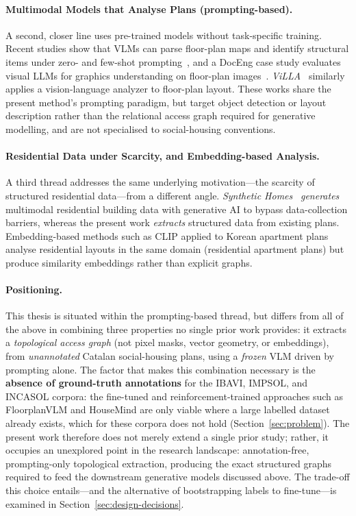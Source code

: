 \documentclass[12pt,a4paper,openright]{report}
\begin{document}
\paragraph{Multimodal Models that Analyse Plans (prompting-based).} A second, closer line uses pre-trained models without task-specific training. Recent studies show that VLMs can parse floor-plan maps and identify structural items under zero- and few-shot prompting~\cite{vlmparsefloorplan2025}, and a DocEng case study evaluates visual LLMs for graphics understanding on floor-plan images~\cite{villmsgraphics2025}. \textit{ViLLA}~\cite{villa2025} similarly applies a vision-language analyzer to floor-plan layout. These works share the present method's prompting paradigm, but target object detection or layout description rather than the relational access graph required for generative modelling, and are not specialised to social-housing conventions.

\paragraph{Residential Data under Scarcity, and Embedding-based Analysis.} A third thread addresses the same underlying motivation---the scarcity of structured residential data---from a different angle. \textit{Synthetic Homes}~\cite{eshbaugh2026synthetichomes} \emph{generates} multimodal residential building data with generative AI to bypass data-collection barriers, whereas the present work \emph{extracts} structured data from existing plans. Embedding-based methods such as CLIP applied to Korean apartment plans~\cite{clipkorean2026} analyse residential layouts in the same domain (residential apartment plans) but produce similarity embeddings rather than explicit graphs.

\paragraph{Positioning.} This thesis is situated within the prompting-based thread, but differs from all of the above in combining three properties no single prior work provides: it extracts a \emph{topological access graph} (not pixel masks, vector geometry, or embeddings), from \emph{unannotated} Catalan social-housing plans, using a \emph{frozen} VLM driven by prompting alone. The factor that makes this combination necessary is the \textbf{absence of ground-truth annotations} for the IBAVI, IMPSOL, and INCASOL corpora: the fine-tuned and reinforcement-trained approaches such as FloorplanVLM and HouseMind are only viable where a large labelled dataset already exists, which for these corpora does not hold (Section~\ref{sec:problem}). The present work therefore does not merely extend a single prior study; rather, it occupies an unexplored point in the research landscape: annotation-free, prompting-only topological extraction, producing the exact structured graphs required to feed the downstream generative models discussed above. The trade-off this choice entails---and the alternative of bootstrapping labels to fine-tune---is examined in Section~\ref{sec:design-decisions}.
\end{document}
